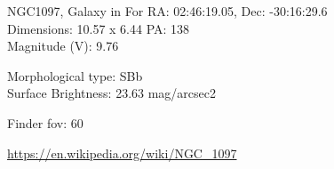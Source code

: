 \begin{block}{NGC1097, Galaxy in For}
    RA: 02:46:19.05, Dec: -30:16:29.6 \\ 
    Dimensions: 10.57 x 6.44 PA: 138 \\ 
    Magnitude (V): 9.76

    Morphological type: SBb \\ 
    Surface Brightness: 23.63 mag/arcsec2 


    Finder fov: 60 

    \url{https://en.wikipedia.org/wiki/NGC_1097} 
\end{block}